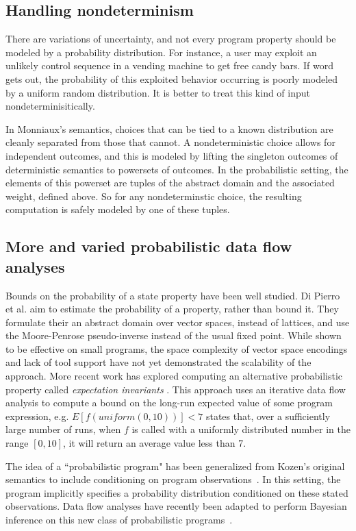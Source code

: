 \subsection{Handling nondeterminism}

There are variations of uncertainty,
and not every program property should be modeled by a
probability distribution.
For instance, a user may exploit an unlikely control sequence
in a vending machine to get free candy bars. 
If word gets out, the probability of
this exploited behavior occurring is poorly modeled by a uniform 
random distribution.
It is better to treat this kind of input nondeterminisitically.

In Monniaux's semantics, choices that can be tied to a known
distribution are cleanly separated from those that cannot.
A nondeterministic choice allows for independent outcomes, and
this is modeled by lifting the singleton outcomes of deterministic
semantics to powersets of outcomes.
In the probabilistic setting, the elements of this powerset are
tuples of the abstract domain and the associated weight, defined
above.
So for any nondeterminstic choice, the resulting computation 
is safely modeled by one of these tuples.

\subsection{More and varied probabilistic data flow analyses}

Bounds on the probability of a state property have been well studied.
Di Pierro et al. \cite{di2013probabilistic} aim to estimate the probability of a property,
rather than bound it.  They formulate their an abstract 
domain over vector spaces, instead of lattices, and use
the Moore-Penrose pseudo-inverse instead of the usual fixed point.
While shown to be effective on small programs, the space
complexity of vector space encodings and lack of tool support
have not yet demonstrated the scalability of the approach.
More recent work has explored computing an alternative probabilistic
property called {\sl expectation invariants} \cite{chakarov2014expectation}.
This approach uses an iterative data flow analysis to 
compute a bound on the long-run expected value of
some program expression, e.g. $E[f(uniform(0,10))] < 7$ states that,
over a sufficiently large number of runs, when $f$ is called with
a uniformly distributed number in the range $[0,10]$, it will return
an average value less than 7.

The idea of a ``probabilistic program" has been generalized from
Kozen's original semantics to include conditioning on program
observations~\cite{Gordon2014}.
In this setting, the program implicitly specifies a probability 
distribution conditioned on these stated observations.
Data flow analyses have recently been adapted to perform Bayesian
inference on this new class of probabilistic 
programs~\cite{claret2013bayesian}.  
